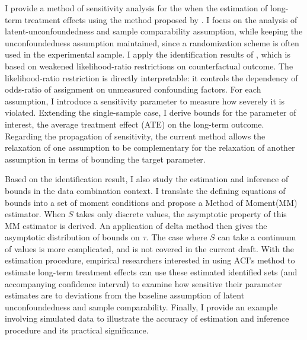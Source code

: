 \documentclass[12pt]{article}
\begin{document}
	
	I provide a method of sensitivity analysis for the when the estimation of long-term treatment effects using the method proposed by \textcite{athey2020combining}. I focus on the analysis of latent-unconfoundedness and sample comparability assumption, while keeping the unconfoundedness assumption maintained, since a randomization scheme is often used in the experimental sample.
    I apply the identification results of \textcite{yadlowsky2018bounds}, which is based on weakened likelihood-ratio restrictions on counterfactual outcome. The likelihood-ratio restriction is directly interpretable: it controls the dependency of odds-ratio of assignment on unmeasured confounding factors. For each assumption, I introduce a sensitivity parameter to measure how severely it is violated. Extending the single-sample case, I derive bounds for the parameter of interest, the average treatment effect (ATE) on the long-term outcome. Regarding the propagation of sensitivity, the current method allows the relaxation of one assumption to be complementary for the relaxation of another assumption in terms of bounding the target parameter.
	
	
	Based on the identification result, I also study the estimation and inference of bounds in the data combination context.
    I translate the defining equations of bounds into a set of moment conditions and propose a Method of Moment(MM) estimator. 
    When $S$ takes only discrete values, the asymptotic property of this MM estimator is derived. An application of delta method then gives the asymptotic distribution of bounds on $\tau$. The case where $S$ can take a continuum of values is more complicated, and is not covered in the current draft.
    With the estimation procedure, empirical researchers interested in using ACI's method to estimate long-term treatment effects can use these estimated identified sets (and accompanying confidence interval) to examine how sensitive their parameter estimates are to deviations from the baseline assumption of latent unconfoundedness and sample comparability. 
    Finally, I provide an example involving simulated data to illustrate the accuracy of estimation and inference procedure and its practical significance. 
	
\end{document}
